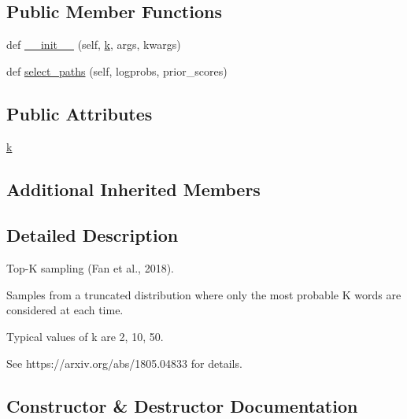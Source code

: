 \subsection*{Public Member Functions}
\begin{DoxyCompactItemize}
\item 
def \hyperlink{classparlai_1_1core_1_1torch__generator__agent_1_1TopKSampling_aa45e1c1fe90c563bf8057969417545e4}{\+\_\+\+\_\+init\+\_\+\+\_\+} (self, \hyperlink{classparlai_1_1core_1_1torch__generator__agent_1_1TopKSampling_a69d2f8e711e51151aa6649a4889e8243}{k}, args, kwargs)
\item 
def \hyperlink{classparlai_1_1core_1_1torch__generator__agent_1_1TopKSampling_a3ca83b8ee8aff13c05afbb973f948b6f}{select\+\_\+paths} (self, logprobs, prior\+\_\+scores)
\end{DoxyCompactItemize}
\subsection*{Public Attributes}
\begin{DoxyCompactItemize}
\item 
\hyperlink{classparlai_1_1core_1_1torch__generator__agent_1_1TopKSampling_a69d2f8e711e51151aa6649a4889e8243}{k}
\end{DoxyCompactItemize}
\subsection*{Additional Inherited Members}


\subsection{Detailed Description}
\begin{DoxyVerb}Top-K sampling (Fan et al., 2018).

Samples from a truncated distribution where only the most probable K words
are considered at each time.

Typical values of k are 2, 10, 50.

See https://arxiv.org/abs/1805.04833 for details.
\end{DoxyVerb}
 

\subsection{Constructor \& Destructor Documentation}
\mbox{\label{classparlai_1_1core_1_1torch__generator__agent_1_1TopKSampling_aa45e1c1fe90c563bf8057969417545e4}} 
